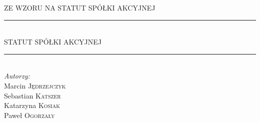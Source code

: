 \documentclass[a4paper, 11pt]{article}
\begin{document}
	
	\begin{titlepage}
	
	
		
		\newcommand{\HRule}{\rule{\linewidth}{0.5mm}} %
		
		\center %
		
		
		\textsc{\LARGE ZE WZORU NA STATUT SPÓŁKI AKCYJNEJ}\\[1.5cm] %
		
		



		\HRule \\[0.4cm]
		{\fontsize{38}{50}\selectfont STATUT SPÓŁKI AKCYJNEJ }
		\HRule \\[1.5cm]
		
		
		\Large \emph{Autorzy:}\\
		Marcin \textsc{Jędrzejczyk}\\ %
		Sebastian \textsc{Katszer}\\ %
		Katarzyna \textsc{Kosiak} \\ %
		Paweł	  \textsc{Ogorzały} \\ [3cm]\


\end{titlepage}
\end{document}
